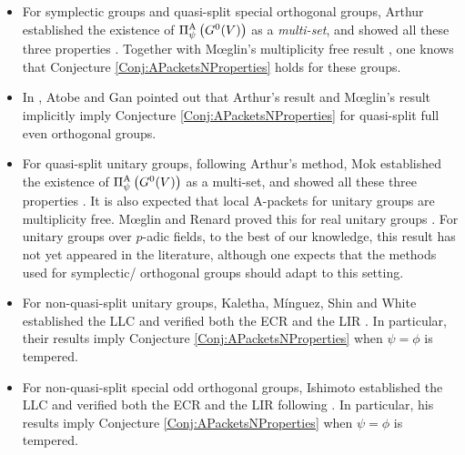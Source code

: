 \documentclass[11pt,letterpaper]{amsart}
\theoremstyle{plain}
\numberwithin{theorem}{section}
\numberwithin{equation}{subsection}
\theoremstyle{remark}
\def\AP{\Pi^{\rm A}} %
\begin{document}
\begin{itemize}
    \item For symplectic groups and quasi-split special orthogonal groups, Arthur established the existence of $\AP_\psi\left(G^0(V)\right)$ as a \emph{multi-set}, and showed all these three properties \cite[Thm. 1.5.1, 2.2.1, 2.4.1, Prop. 7.4.1]{MR3135650}. Together with M{\oe}glin's multiplicity free result \cite{MR2767522}, one knows that Conjecture \ref{Conj:APacketsNProperties} holds for these groups.

    \vskip 5pt

    \item In \cite{MR3708200}, Atobe and Gan pointed out that Arthur's result and M{\oe}glin's result implicitly imply Conjecture \ref{Conj:APacketsNProperties} for quasi-split full even orthogonal groups. 

    \vskip 5pt

    \item For quasi-split unitary groups, following Arthur's method, Mok established the existence of $\AP_\psi\left(G^0(V)\right)$ as a multi-set, and showed all these three properties \cite[Thm. 2.5.1, 3.2.1, 3.4.3, Prop. 8.4.1]{MR3338302}. It is also expected that local A-packets for unitary groups are multiplicity free. M{\oe}glin and Renard proved this for real unitary groups \cite[Thm. 1.3]{MR3947270}. For unitary groups over $p$-adic fields, to the best of our knowledge, this result has not yet appeared in the literature, although one expects that the methods used for symplectic/ orthogonal groups should adapt to this setting.

    \vskip 5pt

    \item For non-quasi-split unitary groups, Kaletha, M{\'i}nguez, Shin and White established the LLC and verified both the ECR and the LIR \cite[Thm. 1.6.1, 2.6.2]{kaletha2014endoscopic}. In particular, their results imply Conjecture \ref{Conj:APacketsNProperties} when $\psi=\phi$ is tempered.

    \vskip 5pt

    \item For non-quasi-split special odd orthogonal groups, Ishimoto established the LLC and verified both the ECR and the LIR \cite[Thm. 1.2, 4.13]{MR4776199} following \cite{kaletha2014endoscopic}. In particular, his results imply Conjecture \ref{Conj:APacketsNProperties} when $\psi=\phi$ is tempered.

    \vskip 5pt


\end{itemize}
\end{document}
